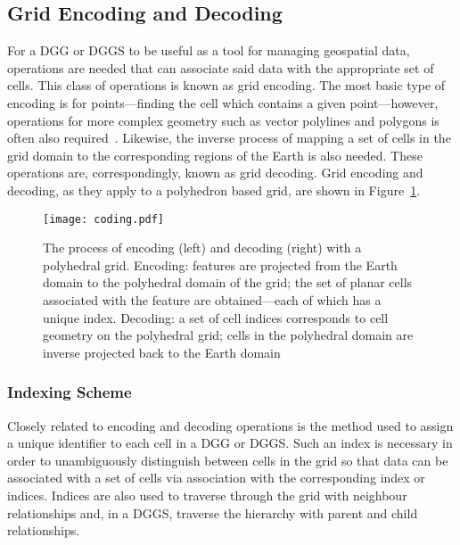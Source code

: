 \subsection{Grid Encoding and Decoding} \label{chap:2:coding}
For a DGG or DGGS to be useful as a tool for managing geospatial data, operations are needed that can associate said data with the appropriate set of cells.
This class of operations is known as grid encoding.
The most basic type of encoding is for points---finding the cell which contains a given point---however, operations for more complex geometry such as vector polylines and polygons is often also required~\cite{du2018duality}.
Likewise, the inverse process of mapping a set of cells in the grid domain to the corresponding regions of the Earth is also needed.
These operations are, correspondingly, known as grid decoding.
Grid encoding and decoding, as they apply to a polyhedron based grid, are shown in Figure~\ref{fig:coding}.


\begin{figure}[tb]
	\centering
	\texttt{[image: coding.pdf]}
	\caption[Grid Encoding and Decoding with a Polyhedral Grid]{
		The process of encoding (left) and decoding (right) with a polyhedral grid.
		Encoding: features are projected from the Earth domain to the polyhedral domain of the grid; the set of planar cells associated with the feature are obtained---each of which has a unique index.
		Decoding: a set of cell indices corresponds to cell geometry on the polyhedral grid; cells in the polyhedral domain are inverse projected back to the Earth domain
	}
	\label{fig:coding}
\end{figure}


\subsubsection{Indexing Scheme} \label{chap:2:indexing}
Closely related to encoding and decoding operations is the method used to assign a unique identifier to each cell in a DGG or DGGS.
Such an index is necessary in order to unambiguously distinguish between cells in the grid so that data can be associated with a set of cells via association with the corresponding index or indices.
Indices are also used to traverse through the grid with neighbour relationships and, in a DGGS, traverse the hierarchy with parent and child relationships.


